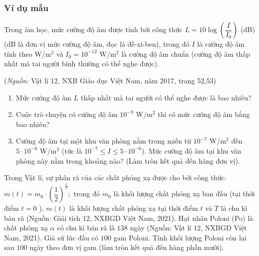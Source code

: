 \subsubsection{Ví dụ mẫu}
\begin{vd}%
	Trong âm học, mức cường độ âm được tính bới công thức $L=10\log\left(\dfrac{I}{I_0}\right)$ (dB) (dB là đơn vị mức cường độ âm, đọc là đề-xi-ben), trong đó $I$ là cường độ âm tính theo W/m$^2$ và $I_0=10^{-12}$ W/m$^2$ là cường độ âm chuẩn (cường độ âm thấp nhất mà tai người bình thường có thể nghe được).
	\begin{center}
		(\textit{Nguồn:} Vật lí 12, NXB Giáo dục Việt Nam, năm 2017, trang 52,53)
	\end{center}
	\begin{enumerate}
		\item Mức cường độ âm $L$ thấp nhất mà tai người có thể nghe được là bao nhiêu?
		\item Cuộc trò chuyện có cường độ âm $10^{-9}$ W/m$^2$ thì có mức cường độ âm bằng bao nhiêu?
		\item Cường độ âm tại một khu văn phòng nằm trong miền từ $10^{-7}$ W/m$^2$ đến $5\cdot10^{-6}$ W/m$^2$ (tức là $10^{-7}\le I\le5\cdot10^{-6}$). Mức cường độ âm tại khu văn phòng này nằm trong khoảng nào? (Làm tròn kết quả đến hàng đơn vị).
	\end{enumerate}
\end{vd}
\begin{vd}%
	Trong Vật lí, sự phân rã của các chất phóng xạ được cho bởi công thức: $m(t)=m_0 \cdot\left(\dfrac{1}{2}\right)^{\tfrac{t}{T}} ;$ trong đó $m_0$ là khối lượng chất phóng xạ ban đầu (tại thời điểm $t=0$ ), $m(t)$ là khối lượng chất phóng xạ tại thời điểm $t$ và $T$ là chu kì bán rã (Nguồn: Giải tích 12, NXBGD Việt Nam, 2021). Hạt nhân Poloni (Po) là chất phóng xạ $\alpha$ có chu kì bán rã là $138$ ngày (Nguồn: Vật lí 12, NXBGD Việt Nam, 2021). Giả sử lúc đầu có $100$ gam Poloni. Tính khối lượng Poloni còn lại sau $100$ ngày theo đơn vị gam (làm tròn kết quả đến hàng phần mười).
\end{vd}

